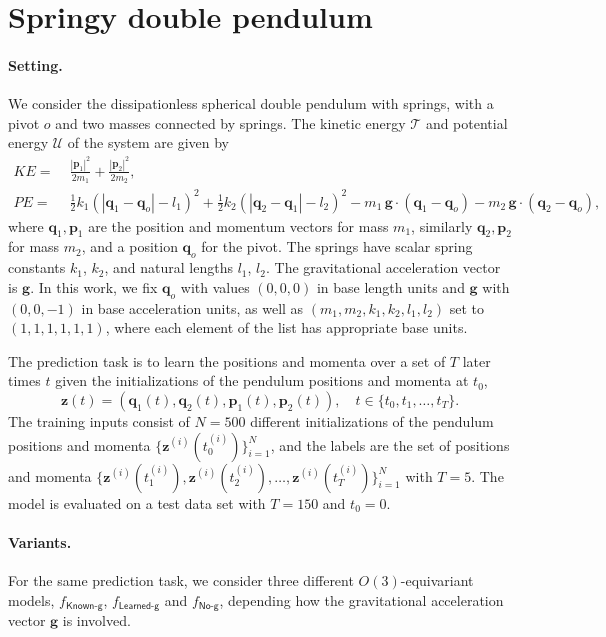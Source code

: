 \documentclass[accepted]{article}
\renewcommand{\mathcal}[1]{\mathscr{#1}} %
\begin{document}
\section{Springy double pendulum}\label{app:pendulum}
\paragraph{Setting.}
We consider the dissipationless spherical double pendulum with springs, with a pivot $o$ and two masses connected by springs. The kinetic energy $\mathcal{T}$ and potential energy $\mathcal{U}$ of the system are given by
\begin{align}
    KE =&\;\frac{|\mathbf{p}_1|^2}{2m_1} +\frac{|\mathbf{p}_2|^2}{2m_2}, \label{eq:energy_T}\\
    PE =&\;\frac12 k_1(|\mathbf{q}_1-\mathbf{q}_o|-l_1)^2 + \frac12 k_2(|\mathbf{q}_2-\mathbf{q}_1|-l_2)^2 
    -m_1\,\mathbf{g}\cdot (\mathbf{q}_1-\mathbf{q}_o)- m_2 \,\mathbf{g}\cdot  (\mathbf{q}_2-\mathbf{q}_o), \label{eq:energy_U}
\end{align}
where $\mathbf{q}_1, \mathbf{p}_1$ are the position and momentum vectors for mass $m_1$, similarly $\mathbf{q}_2, \mathbf{p}_2$ for mass $m_2$, and a position $\mathbf{q}_o$ for the pivot. The springs have scalar spring constants $k_1$, $k_2$, and natural lengths $l_1$, $l_2$. The gravitational acceleration vector is $\mathbf{g}$. 
In this work, we fix $\mathbf{q}_o$ with values $(0,0,0)$ in base length units and $\mathbf{g}$ with $(0,0,-1)$ in base acceleration units, as well as $(m_1, m_2, k_1, k_2, l_1, l_2)$ set to $(1,1,1,1,1,1)$, where each element of the list has appropriate base units. 

The prediction task is to learn the positions and momenta over a set of $T$ later times $t$ given the initializations of the pendulum positions and momenta at $t_0$,
\begin{equation}
\mathbf{z}(t)=(\mathbf{q}_1(t),\mathbf{q}_2(t),\mathbf{p}_1(t),\mathbf{p}_2(t)), \quad t\in\{t_0, t_1,\ldots,t_T\}. 
\end{equation}
The training inputs consist of $N=500$ different initializations of the pendulum positions and momenta $\{\mathbf{z}^{(i)}(t_0^{(i)})\}_{i=1}^N$, and the labels are the set of positions and momenta $\{\mathbf{z}^{(i)}(t_1^{(i)}),\mathbf{z}^{(i)}(t_2^{(i)}),\ldots,\mathbf{z}^{(i)}(t_T^{(i)})\}_{i=1}^N$ with $T=5$.
The model is evaluated on a test data set with $T=150$ and $t_0=0$. 

\paragraph{Variants.}
For the same prediction task, we consider three different $O(3)$-equivariant models, $f_{\textsf{Known-g}}$, $f_{\textsf{Learned-g}}$ and $f_{\textsf{No-g}}$, depending how the gravitational acceleration vector $\mathbf{g}$ is involved. 
\end{document}
